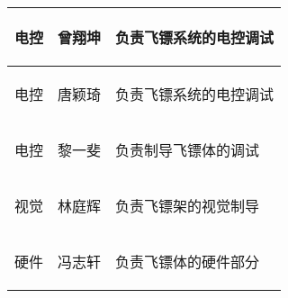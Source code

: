\begin{longtable}{ p{2cm} | p{3.5cm} | p{9.3cm} |}
    \hline

        \begin{center}
            电控
        \end{center}&
        \begin{center}
            曾翔坤
        \end{center}&
        \begin{center}
            负责飞镖系统的电控调试
        \end{center}\\
        
    \hline
    
        \begin{center}
            电控
        \end{center}&
        \begin{center}
            唐颖琦
        \end{center}&
        \begin{center}
            负责飞镖系统的电控调试
        \end{center}\\

    \hline
    
        \begin{center}
            电控
        \end{center}&
        \begin{center}
            黎一斐
        \end{center}&
        \begin{center}
            负责制导飞镖体的调试
        \end{center}\\

    \hline

        \begin{center}
            视觉
        \end{center}&
        \begin{center}
            林庭辉
        \end{center}&
        \begin{center}
            负责飞镖架的视觉制导
        \end{center}\\
        
    \hline
    
        \begin{center}
            硬件
        \end{center}&
        \begin{center}
            冯志轩
        \end{center}&
        \begin{center}
            负责飞镖体的硬件部分
        \end{center}\\

    \hline
    
\end{longtable}
